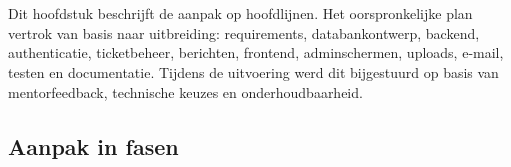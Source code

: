 
\chapter{}%
\label{ch:methodologie}


Dit hoofdstuk beschrijft de aanpak op hoofdlijnen. Het oorspronkelijke plan vertrok van basis naar uitbreiding: requirements, databankontwerp, backend, authenticatie, ticketbeheer, berichten, frontend, adminschermen, uploads, e-mail, testen en documentatie. Tijdens de uitvoering werd dit bijgestuurd op basis van mentorfeedback, technische keuzes en onderhoudbaarheid.

\section{Aanpak in fasen}

